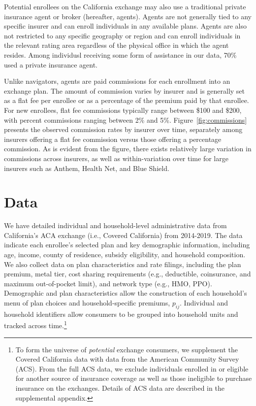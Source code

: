 \documentclass[12pt]{article}
\begin{document}
Potential enrollees on the California exchange may also use a traditional private insurance agent or broker (hereafter, agents). Agents are not generally tied to any specific insurer and can enroll individuals in any available plans. Agents are also not restricted to any specific geography or region and can enroll individuals in the relevant rating area regardless of the physical office in which the agent resides. Among individusl receiving some form of assistance in our data, 70\% used a private insurance agent.

Unlike navigators, agents are paid commissions for each enrollment into an exchange plan. The amount of commission varies by insurer and is generally set as a flat fee per enrollee or as a percentage of the premium paid by that enrollee. For new enrollees, flat fee commissions typically range between \$100 and \$200, with percent commissions ranging between 2\% and 5\%. Figure~\ref{fig:commissions} presents the observed commission rates by insurer over time, separately among insurers offering a flat fee commission versus those offering a percentage commission. As is evident from the figure, there exists relatively large variation in commissions across insurers, as well as within-variation over time for large insurers such as Anthem, Health Net, and Blue Shield.


\section{Data}
\label{sec:data}
We have detailed individual and household-level administrative data from California's ACA exchange (i.e., Covered California) from 2014-2019. The data indicate each enrollee's selected plan and key demographic information, including age, income, county of residence, subsidy eligibility, and household composition. We also collect data on plan characteristics and rate filings, including the plan premium, metal tier, cost sharing requirements (e.g., deductible, coinsurance, and maximum out-of-pocket limit), and network type (e.g., HMO, PPO). Demographic and plan characteristics allow the construction of each household's menu of plan choices and household-specific premiums, $p_{ij}$. Individual and household identifiers allow consumers to be grouped into household units and tracked across time.\footnote{To form the universe of \textit{potential} exchange consumers, we supplement the Covered California data with data from the American Community Survey (ACS). From the full ACS data, we exclude individuals enrolled in or eligible for another source of insurance coverage as well as those ineligible to purchase insurance on the exchanges. Details of ACS data are described in the supplemental appendix.} 
\end{document}
